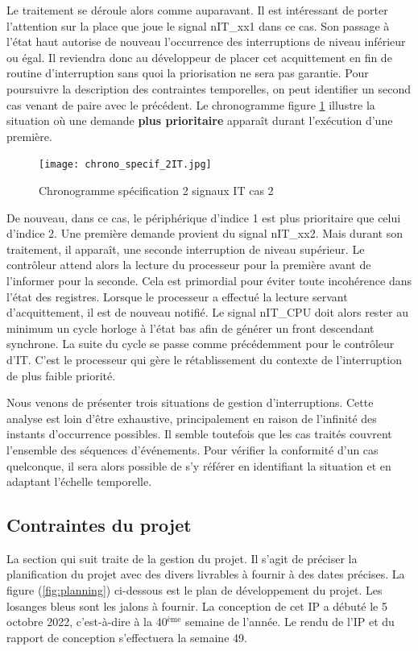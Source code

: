 Le traitement se déroule alors comme auparavant.
Il est intéressant de porter l'attention sur la place que joue le signal nIT\_xx1 dans ce cas.
Son passage à l'état haut autorise de nouveau l'occurrence des interruptions de niveau inférieur ou égal.
Il reviendra donc au développeur de placer cet acquittement en fin de routine d'interruption sans quoi la priorisation ne sera pas garantie.
Pour poursuivre la description des contraintes temporelles, on peut identifier un second cas venant de paire avec le précédent.
Le chronogramme figure \ref{fig:spe_2IT} illustre la situation où une demande \textbf{plus prioritaire} apparaît durant l'exécution d'une première.
\begin{figure}[H]
	\centering
	\texttt{[image: chrono\_specif\_2IT.jpg]}
	\caption{Chronogramme spécification 2 signaux IT cas 2}
	\label{fig:spe_2IT}
\end{figure}
De nouveau, dans ce cas, le périphérique d'indice 1 est plus prioritaire que celui d'indice 2. 
Une première demande provient du signal nIT\_xx2.
Mais durant son traitement, il apparaît, une seconde interruption de niveau supérieur.
Le contrôleur attend alors la lecture du processeur pour la première avant de l'informer pour la seconde.
Cela est primordial pour éviter toute incohérence dans l'état des registres.
Lorsque le processeur a effectué la lecture servant d'acquittement, il est de nouveau notifié.
Le signal nIT\_CPU doit alors rester au minimum un cycle horloge à l'état bas afin de générer un front descendant synchrone.
La suite du cycle se passe comme précédemment pour le contrôleur d'IT.
C'est le processeur qui gère le rétablissement du contexte de l'interruption de plus faible priorité.

\gap
Nous venons de présenter trois situations de gestion d'interruptions. 
Cette analyse est loin d'être exhaustive, principalement en raison de l'infinité des instants d'occurrence possibles.
Il semble toutefois que les cas traités couvrent l'ensemble des séquences d'événements.
Pour vérifier la conformité d'un cas quelconque, il sera alors possible de s'y référer en identifiant la situation et en adaptant l'échelle temporelle.

\subsection{Contraintes du projet}

La section qui suit traite de la gestion du projet.
Il s'agit de préciser la planification du projet avec des divers livrables à fournir à des dates précises.
La figure (\ref{fig:planning}) ci-dessous est le plan de développement du projet.
Les losanges bleus sont les jalons à fournir.
La conception de cet IP a débuté le 5 octobre 2022, c'est-à-dire à la 40$^{\mbox{ème}}$ semaine de l'année.
Le rendu de l'IP et du rapport de conception s'effectuera la semaine 49.

